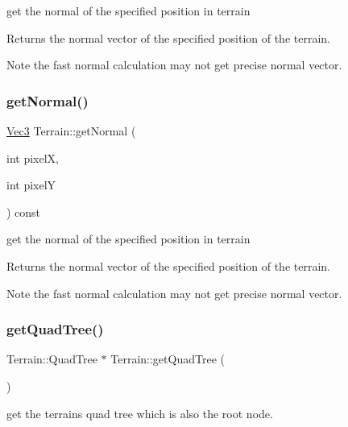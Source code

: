 get the normal of the specified position in terrain \begin{DoxyReturn}{Returns}
the normal vector of the specified position of the terrain. 
\end{DoxyReturn}
\begin{DoxyNote}{Note}
the fast normal calculation may not get precise normal vector. 
\end{DoxyNote}
\mbox{\label{classTerrain_a02f6d646b6171329077453c7a67eb4bd}} 
\subsubsection{\texorpdfstring{get\+Normal()}{getNormal()}\hspace{0.1cm}{\footnotesize\ttfamily [2/2]}}
{\footnotesize\ttfamily \hyperlink{classVec3}{Vec3} Terrain\+::get\+Normal (\begin{DoxyParamCaption}\item[{int}]{pixelX,  }\item[{int}]{pixelY }\end{DoxyParamCaption}) const}

get the normal of the specified position in terrain \begin{DoxyReturn}{Returns}
the normal vector of the specified position of the terrain. 
\end{DoxyReturn}
\begin{DoxyNote}{Note}
the fast normal calculation may not get precise normal vector. 
\end{DoxyNote}
\mbox{\label{classTerrain_af1d3cb372d1d3d555e7a820eac377605}} 
\subsubsection{\texorpdfstring{get\+Quad\+Tree()}{getQuadTree()}\hspace{0.1cm}{\footnotesize\ttfamily [1/2]}}
{\footnotesize\ttfamily Terrain\+::\+Quad\+Tree $\ast$ Terrain\+::get\+Quad\+Tree (\begin{DoxyParamCaption}{ }\end{DoxyParamCaption})}

get the terrain\textquotesingle{}s quad tree which is also the root node. \mbox{\label{classTerrain_a02299bde517f65a24e4604e4da08c436}} 
